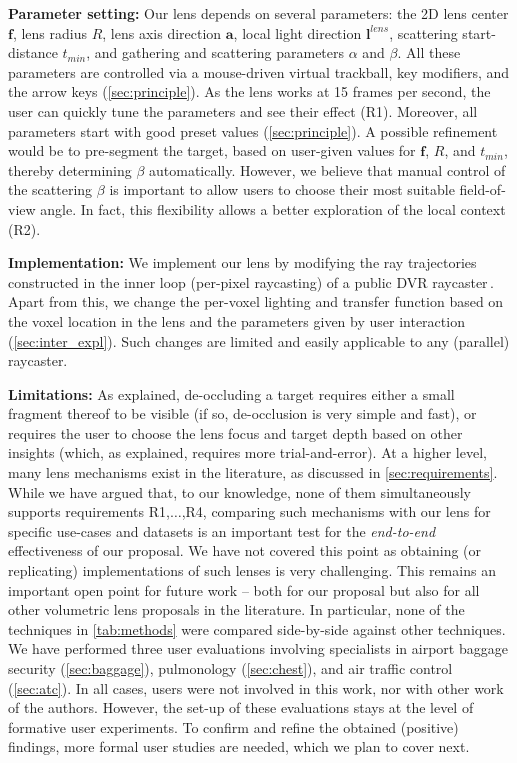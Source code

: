 \vspace{0.15cm}
\noindent\textbf{Parameter setting:} Our lens depends on several parameters: the 2D lens center $\mathbf{f}$, lens radius $R$, lens axis direction $\mathbf{a}$, local light direction $\mathbf{l}^{lens}$, scattering start-distance $t_{min}$, and gathering and scattering parameters $\alpha$ and $\beta$. All these parameters are controlled via a mouse-driven virtual trackball, key modifiers, and the arrow keys (\autoref{sec:principle}). As the lens works at 15 frames per second, the user can quickly tune the parameters and see their effect (R1). Moreover, all parameters start with good preset values (\autoref{sec:principle}). A possible refinement would be to pre-segment the target, based on user-given values for $\mathbf{f}$, $R$, and $t_{min}$, thereby determining $\beta$ automatically. However, we believe that manual control of the scattering $\beta$ is important to allow users to choose their most suitable field-of-view angle. In fact, this flexibility allows a better exploration of the local context (R2).

\vspace{0.15cm}
\noindent\textbf{Implementation:} We implement our lens by modifying the ray trajectories constructed in the inner loop (per-pixel raycasting) of a public DVR raycaster\,\cite{cudasdk}. Apart from this, we change the per-voxel lighting and transfer function based on the voxel location in the lens and the parameters given by user interaction (\autoref{sec:inter_expl}). Such changes are limited and easily applicable to any (parallel) raycaster.

\vspace{0.15cm}
\noindent\textbf{Limitations:} As explained, de-occluding a target requires either a small fragment thereof to be visible (if so, de-occlusion is very simple and fast), or requires the user to choose the lens focus and target depth based on other insights (which, as explained, requires more trial-and-error). At a higher level, many lens mechanisms exist in the literature, as discussed in \autoref{sec:requirements}. While we have argued that, to our knowledge, none of them simultaneously supports requirements R1,$\ldots$,R4, comparing such mechanisms with our lens for specific use-cases and datasets is an important test for the \emph{end-to-end} effectiveness of our proposal. We have not covered this point as obtaining (or replicating)  implementations of such lenses is very challenging. This remains an important open point for future work -- both for our proposal but also for all other volumetric lens proposals in the literature. In particular, none of the techniques in \autoref{tab:methods} were compared side-by-side against other techniques. We have performed three user evaluations involving specialists in airport baggage security (\autoref{sec:baggage}), pulmonology (\autoref{sec:chest}), and air traffic control (\autoref{sec:atc}). In all cases, users were not involved in this work, nor with other work of the authors. However, the set-up of these evaluations stays at the level of formative user experiments. To confirm and refine the obtained (positive) findings, more formal user studies are needed, which we plan to cover next.

